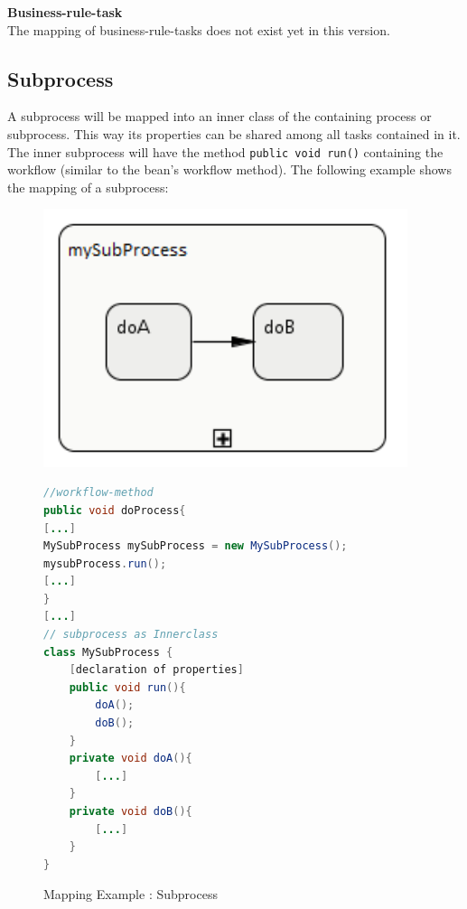 \textbf{Business-rule-task}\\
The mapping of business-rule-tasks does not exist yet in this version.

\subsection{Subprocess}
A subprocess will be mapped into an inner class of the containing process or subprocess. This way its properties can be shared among all tasks contained in it. The inner subprocess will have the method \texttt{public void run()} containing the workflow (similar to the bean's workflow method). The following example shows the mapping of a subprocess:\\

\begin{figure}[h]
\begin{minipage}[c]{0.3\textwidth}
\includegraphics[width=0.95\textwidth]{images/mapping/subprocess.png}
\end{minipage}
\begin{minipage}[c]{0.7\textwidth}
\begin{lstlisting}[language=Java]
//workflow-method
public void doProcess{
[...]
MySubProcess mySubProcess = new MySubProcess();
mysubProcess.run();
[...]
}
[...]
// subprocess as Innerclass
class MySubProcess {
	[declaration of properties]		
	public void run(){
		doA();
		doB();
	}
	private void doA(){
		[...] 
	}	
	private void doB(){ 
		[...] 
	}
}
\end{lstlisting}
\end{minipage}
\caption{Mapping Example : Subprocess}%
\label{fig:mapping_subprocess}%
\end{figure}

